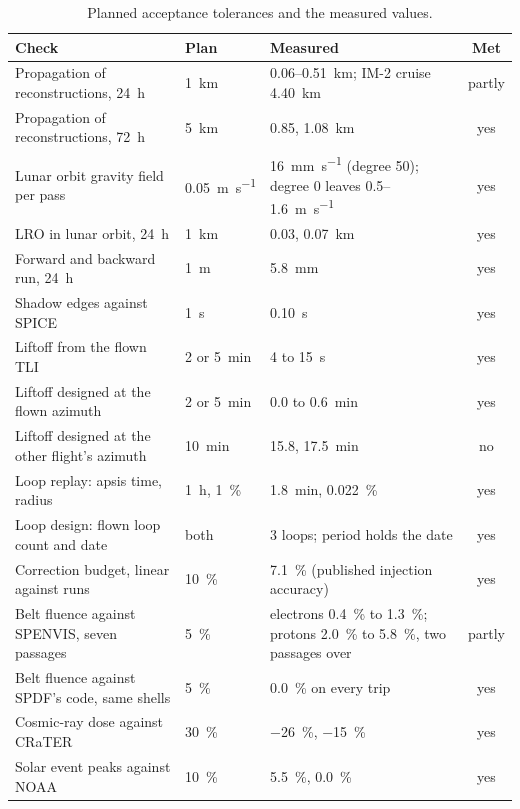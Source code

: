 \documentclass[11pt,a4paper]{article}
\begin{document}
\begin{table}[htbp]
\centering\small
\caption{Planned acceptance tolerances and the measured values.}
\label{tab:gates}
\begin{tabularx}{\textwidth}{@{}p{}lYc@{}}
\toprule
Check & Plan & Measured & Met \\
\midrule
Propagation of reconstructions, \qty{24}{\hour} & \qty{1}{\km} & 0.06--\qty{0.51}{\km}; IM-2 cruise \qty{4.40}{\km} & partly \\
Propagation of reconstructions, \qty{72}{\hour} & \qty{5}{\km} & 0.85, \qty{1.08}{\km} & yes \\
Lunar orbit gravity field per pass & \qty{0.05}{\m\per\s} & \qty{16}{\mm\per\s} (degree 50); degree 0 leaves 0.5--\qty{1.6}{\m\per\s} & yes \\
LRO in lunar orbit, \qty{24}{\hour} & \qty{1}{\km} & 0.03, \qty{0.07}{\km} & yes \\
Forward and backward run, \qty{24}{\hour} & \qty{1}{\m} & \qty{5.8}{\mm} & yes \\
Shadow edges against SPICE & \qty{1}{\s} & \qty{0.10}{\s} & yes \\
Liftoff from the flown TLI & 2 or \qty{5}{\minute} & 4 to \qty{15}{\s} & yes \\
Liftoff designed at the flown azimuth & 2 or \qty{5}{\minute} & 0.0 to \qty{0.6}{\minute} & yes \\
Liftoff designed at the other flight's azimuth & \qty{10}{\minute} & 15.8, \qty{17.5}{\minute} & no \\
Loop replay: apsis time, radius & \qty{1}{\hour}, \qty{1}{\percent} & \qty{1.8}{\minute}, \qty{0.022}{\percent} & yes \\
Loop design: flown loop count and date & both & 3 loops; period holds the date & yes \\
Correction budget, linear against runs & \qty{10}{\percent} & \qty{7.1}{\percent} (published injection accuracy) & yes \\
Belt fluence against SPENVIS, seven passages & \qty{5}{\percent} & electrons \qty{0.4}{\percent} to \qty{1.3}{\percent}; protons \qty{2.0}{\percent} to \qty{5.8}{\percent}, two passages over & partly \\
Belt fluence against SPDF's code, same shells & \qty{5}{\percent} & \qty{0.0}{\percent} on every trip & yes \\
Cosmic-ray dose against CRaTER & \qty{30}{\percent} & \qty{-26}{\percent}, \qty{-15}{\percent} & yes \\
Solar event peaks against NOAA & \qty{10}{\percent} & \qty{5.5}{\percent}, \qty{0.0}{\percent} & yes \\

\end{tabularx}
\end{table}
\end{document}
